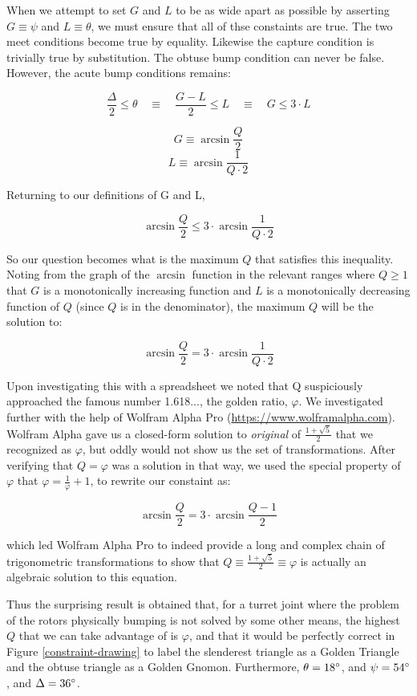 \documentclass[11pt]{article}
\begin{document}
When we attempt to set $G$ and $L$ to be as wide apart as possible by asserting $G \equiv \psi$ and $L \equiv \theta$, we must
ensure that all of thse constaints are true. The two meet conditions become true by equality. Likewise the capture condition
is trivially true by substitution. The obtuse bump condition can
never be false.  However, the acute bump conditions remains:

\[ \tag{acute bump} \frac{\Delta}{2} \leq \theta  \quad \equiv \quad \frac{G - L}{2} \leq L  \quad \equiv \quad G \leq 3 \cdot L \]

\[
G \equiv \arcsin{\frac{Q}{2}}
\]
\[
L \equiv \arcsin{\frac{1}{Q \cdot 2}}
\]

Returning to our definitions of G and L,

\[ \arcsin{\frac{Q}{2}} \leq 3 \cdot \arcsin{\frac{1}{Q \cdot 2}} \]

So our question becomes what is the maximum $Q$ that satisfies this inequality. Noting from the graph of the $\arcsin$ function in
the relevant ranges where $Q \geq 1$ that $G$ is a monotonically increasing function and $L$ is a
monotonically decreasing function of $Q$ (since $Q$ is in the denominator), the maximum $Q$ will be the solution to:

\[\tag{original}  \arcsin{\frac{Q}{2}} = 3 \cdot \arcsin{\frac{1}{Q \cdot 2}} \]

Upon investigating this with a spreadsheet we noted that Q suspiciously approached the famous number 1.618..., the golden ratio, $\varphi$.
We investigated further with the help of Wolfram Alpha Pro
(\href{https://www.wolframalpha.com}{https://www.wolframalpha.com}).
Wolfram Alpha gave us a closed-form solution to \emph{original} of $\frac{1 + \sqrt{5}}{2}$
that we recognized as $\varphi$, but oddly would
not show us the set of transformations. After verifying that $Q = \varphi$ was
a solution in that way, we used the special property of
$\varphi$ that $ \varphi = \frac{1}{\varphi} + 1 $, to rewrite our constaint as:

\[\tag{assuming $Q=\varphi$} \arcsin{\frac{Q}{2}} = 3 \cdot \arcsin{\frac{Q - 1}{2}} \]

which led Wolfram Alpha Pro to indeed provide a long and complex chain of trigonometric transformations to show that
$Q \equiv \frac{1 + \sqrt{5}}{2} \equiv \varphi$ is actually an algebraic solution to
this equation.

Thus the surprising result is obtained that, for a turret joint where the problem of the rotors physically bumping is not
solved by some other means, the highest $Q$ that we can take advantage of is $\varphi$, and that it would be
perfectly correct in Figure \ref{constraint-drawing} to label the slenderest triangle as a Golden Triangle and the obtuse
triangle as a Golden Gnomon. Furthermore, $\theta = 18\degree$, and $\psi = 54\degree$, and $\Delta = 36\degree$.
\end{document}
